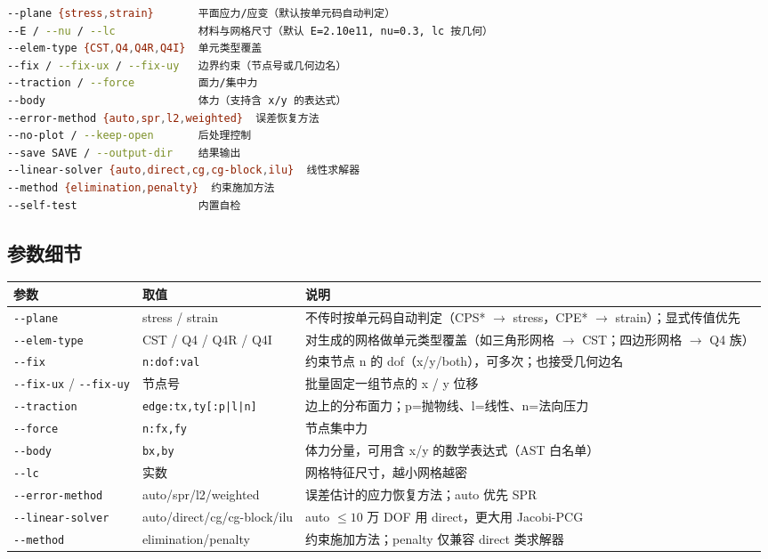 \documentclass[12pt,a4paper]{ctexart}
\newcommand{\fem}{\Verb}
\begin{document}
\begin{lstlisting}[language=bash]
--plane {stress,strain}       平面应力/应变（默认按单元码自动判定）
--E / --nu / --lc             材料与网格尺寸（默认 E=2.10e11, nu=0.3, lc 按几何）
--elem-type {CST,Q4,Q4R,Q4I}  单元类型覆盖
--fix / --fix-ux / --fix-uy   边界约束（节点号或几何边名）
--traction / --force          面力/集中力
--body                        体力（支持含 x/y 的表达式）
--error-method {auto,spr,l2,weighted}  误差恢复方法
--no-plot / --keep-open       后处理控制
--save SAVE / --output-dir    结果输出
--linear-solver {auto,direct,cg,cg-block,ilu}  线性求解器
--method {elimination,penalty}  约束施加方法
--self-test                   内置自检
\end{lstlisting}

\subsection{参数细节}

\begin{table}[h]
\centering
\small
\begin{tabular}{p{3.2cm}p{3.4cm}p{7.8cm}}
\toprule
\textbf{参数} & \textbf{取值} & \textbf{说明} \\
\midrule
\fem|--plane| & stress / strain & 不传时按单元码自动判定（CPS* $\to$ stress，CPE* $\to$ strain）；显式传值优先 \\
\fem|--elem-type| & CST / Q4 / Q4R / Q4I & 对生成的网格做单元类型覆盖（如三角形网格 $\to$ CST；四边形网格 $\to$ Q4 族） \\
\fem|--fix| & \fem|n:dof:val| & 约束节点 n 的 dof（x/y/both），可多次；也接受几何边名 \\
\fem|--fix-ux| / \fem|--fix-uy| & 节点号 & 批量固定一组节点的 x / y 位移 \\
\fem|--traction| & \texttt{edge:tx,ty[:p|l|n]} & 边上的分布面力；p=抛物线、l=线性、n=法向压力 \\
\fem|--force| & \fem|n:fx,fy| & 节点集中力 \\
\fem|--body| & \fem|bx,by| & 体力分量，可用含 x/y 的数学表达式（AST 白名单） \\
\fem|--lc| & 实数 & 网格特征尺寸，越小网格越密 \\
\fem|--error-method| & auto/spr/l2/weighted & 误差估计的应力恢复方法；auto 优先 SPR \\
\fem|--linear-solver| & auto/direct/cg/cg-block/ilu & auto $\le 10$ 万 DOF 用 direct，更大用 Jacobi-PCG \\
\fem|--method| & elimination/penalty & 约束施加方法；penalty 仅兼容 direct 类求解器 \\
\bottomrule
\end{tabular}
\end{table}
\end{document}
